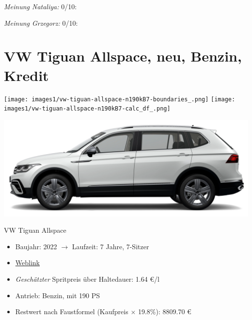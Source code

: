 \documentclass[landscape, DIV=99, 14pt]{scrartcl}
\begin{document}
\begin{small}
\emph{Meinung Nataliya:} 0/10: 
        
\emph{Meinung Grzegorz:} 0/10: 
\end{small}

\pagebreak


\twocolumn

\section*{VW Tiguan Allspace, neu, Benzin, Kredit}
\begin{center}
\texttt{[image: images1/vw-tiguan-allspace-n190kB7-boundaries\_.png]}
\null
\vspace{0.5cm}
\texttt{[image: images1/vw-tiguan-allspace-n190kB7-calc\_df\_.png]}
\end{center}

\pagebreak
\begin{center}
\includegraphics[width=0.9\columnwidth]{cars/vw-tiguan-diesel.png}

VW Tiguan Allspace
\end{center}

\begin{itemize}
    \item Baujahr: 2022 $\rightarrow$ Laufzeit: 7 Jahre, 7-Sitzer
    \item \href{https://www.volkswagen.de/de/konfigurator.html/__app/der-neue-tiguan-allspace/der-tiguan-allspace---standardmodelle/elegance.app?buildabilityStatus-app=buildable&category-app=private&carlineId-app=31160&salesGroupId-app=32700&trimName-app=Elegance&modelId-app=BJ247T%24GYORYOR&modelVersion-app=2&modelYear-app=2022&exteriorId-app=F14+0Q0Q&interiorId-app=F56+++++BG&options-app=GWBAWBA-GPG4PG4-MAHV1M6-GPFCPFC-GRBDRBD-MKSUKA2}{Weblink}
    \item \emph{Gesch\"atzter} Spritpreis \"uber Haltedauer: 1.64 \euro{}/l
    \item Antrieb: Benzin, mit 190 PS
    \item Restwert nach Faustformel (Kaufpreis $\times$ 19.8\%): 8809.70 \euro{}
\end{itemize}
\end{document}
